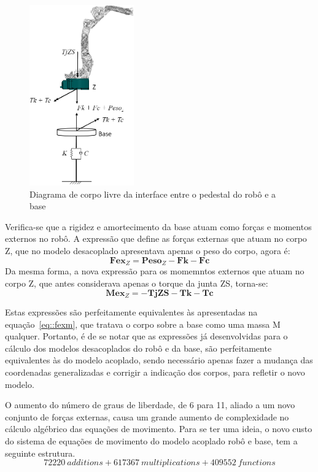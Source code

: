 \begin{figure}[h]
	\centering 
 	\includegraphics[width=0.40\textwidth]{figs/dcl_interface}
 	\caption{Diagrama de corpo livre da interface entre o pedestal do robô e a
 	base}
 	\label{fig::dcl_interface}
\end{figure}

Verifica-se que a rigidez e amortecimento da base atuam como forças e momentos
externos no robô. A expressão que define as forças externas que atuam no corpo
Z, que no modelo desacoplado apresentava apenas o peso do corpo, agora é:
%
\begin{equation}
	\mathbf{Fex}_Z = \mathbf{Peso}_Z - \mathbf{Fk} - \mathbf{Fc}
\end{equation}
%
Da mesma forma, a nova expressão para os momemntos externos que atuam no corpo
Z, que antes considerava apenas o torque da junta ZS, torna-se:
%
\begin{equation}
	\mathbf{Mex}_Z = -\mathbf{TjZS} - \mathbf{Tk} - \mathbf{Tc}
\end{equation}
%

Estas expressões são perfeitamente equivalentes às apresentadas na
equação~\ref{eq::fexm}, que tratava o corpo sobre a base como uma massa M
qualquer. Portanto, é de se notar que as expressões já desenvolvidas para o
cálculo dos modelos desacoplados do robô e da base, são perfeitamente
equivalentes às do modelo acoplado, sendo necessário apenas fazer a mudança das
coordenadas generalizadas e corrigir a indicação dos corpos, para refletir o
novo modelo.

O aumento do número de graus de liberdade, de 6 para 11, aliado a um novo
conjunto de forças externas, causa um grande aumento de complexidade no
cálculo algébrico das equações de movimento. Para se ter uma ideia, o novo custo
do sistema de equações de movimento do modelo acoplado robô e base, tem a
seguinte estrutura.
%
$$ 72220~\textit{additions} + 617367~\textit{multiplications} + 409552~
\textit{functions} $$
%


